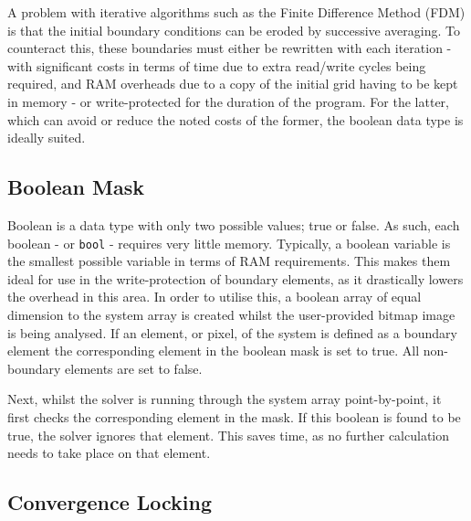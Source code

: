 		A problem with iterative algorithms such as the Finite Difference Method (FDM) is that the initial boundary conditions can be eroded by successive averaging. To counteract this, these boundaries must either be rewritten with each iteration - with significant costs in terms of time due to extra read/write cycles being required, and RAM overheads due to a copy of the initial grid having to be kept in memory - or write-protected for the duration of the program. For the latter, which can avoid or reduce the noted costs of the former, the boolean data type is ideally suited.
		
		\subsection{Boolean Mask}
		
		Boolean is a data type with only two possible values; true or false. As such, each boolean - or \lstinline|bool| - requires very little memory. Typically, a boolean variable is the smallest possible variable in terms of RAM requirements. This makes them ideal for use in the write-protection of boundary elements, as it drastically lowers the overhead in this area. In order to utilise this, a boolean array of equal dimension to the system array is created whilst the user-provided bitmap image is being analysed. If an element, or pixel, of the system is defined as a boundary element the corresponding element in the boolean mask is set to true. All non-boundary elements are set to false.
		
		Next, whilst the solver is running through the system array point-by-point, it first checks the corresponding element in the mask. If this boolean is found to be true, the solver ignores that element. This saves time, as no further calculation needs to take place on that element.
	
		\subsection{Convergence Locking}
		
